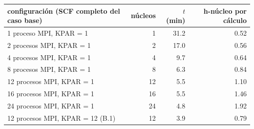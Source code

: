 \begin{tabular}{l r r r}
\toprule
configuración (SCF completo del caso base) & núcleos & $t$ (min) & h-núcleo por cálculo \\
\midrule
1 proceso MPI, KPAR = 1 & 1 & 31.2 & 0.52 \\
2 procesos MPI, KPAR = 1 & 2 & 17.0 & 0.56 \\
4 procesos MPI, KPAR = 1 & 4 & 9.7 & 0.64 \\
8 procesos MPI, KPAR = 1 & 8 & 6.3 & 0.84 \\
12 procesos MPI, KPAR = 1 & 12 & 5.5 & 1.10 \\
16 procesos MPI, KPAR = 1 & 16 & 5.5 & 1.46 \\
24 procesos MPI, KPAR = 1 & 24 & 4.8 & 1.92 \\
12 procesos MPI, KPAR = 12 (B.1) & 12 & 3.9 & 0.79 \\
\bottomrule
\end{tabular}
